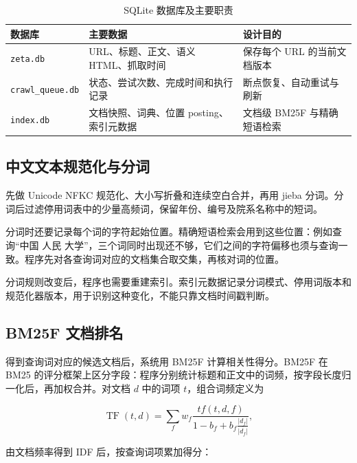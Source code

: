 \documentclass[UTF8,zihao=-4,fontset=fandol]{ctexart}
\newcommand{\code}[1]{\texttt{#1}}
\begin{document}
\begin{table}[H]
\centering
\caption{SQLite 数据库及主要职责}
\label{tab:databases}
\begin{tabularx}{\textwidth}{>{\raggedright\arraybackslash}p{3.2cm}>{\raggedright\arraybackslash}p{4.7cm}>{\raggedright\arraybackslash}X}
\toprule
数据库 & 主要数据 & 设计目的 \\
\midrule
\code{zeta.db} & URL、标题、正文、语义 HTML、抓取时间 & 保存每个 URL 的当前文档版本 \\
\code{crawl\_queue.db} & 状态、尝试次数、完成时间和执行记录 & 断点恢复、自动重试与刷新 \\
\code{index.db} & 文档快照、词典、位置 posting、索引元数据 & 文档级 BM25F 与精确短语检索 \\
\bottomrule
\end{tabularx}
\end{table}

\subsection{中文文本规范化与分词}

 先做 Unicode NFKC 规范化、大小写折叠和连续空白合并，再用 jieba 分词。分词后过滤停用词表中的少量高频词，保留年份、编号及院系名称中的短词。

分词时还要记录每个词的字符起始位置。精确短语检索会用到这些位置：例如查询“中国 人民 大学”，三个词同时出现还不够，它们之间的字符偏移也须与查询一致。程序先对各查询词对应的文档集合取交集，再核对词的位置。

分词规则改变后，程序也需要重建索引。索引元数据记录分词模式、停用词版本和规范化器版本，用于识别这种变化，不能只靠文档时间戳判断。

\subsection{BM25F 文档排名}

得到查询词对应的候选文档后，系统用 BM25F 计算相关性得分。BM25F 在 BM25 的评分框架上区分字段\cite{robertson2009bm25}：程序分别统计标题和正文中的词频，按字段长度归一化后，再加权合并。对文档 $d$ 中的词项 $t$，组合词频定义为

\begin{equation}
\operatorname{TF}(t,d)=\sum_f w_f
\frac{tf(t,d,f)}{1-b_f+b_f\frac{\lvert d_f\rvert}{\overline{\lvert d_f\rvert}}},
\label{eq:bm25f-tf}
\end{equation}

由文档频率得到 IDF 后，按查询词项累加得分：
\end{document}
